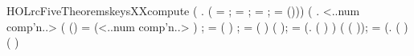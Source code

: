 \begin{SaveVerbatim}{HOLrcFiveTheoremskeysXXcompute}
\HOLTokenTurnstile{} (\HOLSymConst{\HOLTokenForall{}} .
          \HOLSymConst{=}
      (
          =  ;
          =  ;
          =   ;
          =   
         (\HOLSymConst{,}\HOLSymConst{,}\HOLSymConst{,}\HOLSymConst{,}\HOLSymConst{,}))) \HOLSymConst{\HOLTokenConj{}}
   (\HOLSymConst{\HOLTokenForall{}}  .
       <..num comp'n..>   \HOLSymConst{=}
      (
         (\HOLSymConst{,}\HOLSymConst{,}\HOLSymConst{,}\HOLSymConst{,}\HOLSymConst{,}) =  (<..num comp'n..> \HOLSymConst{\ensuremath{-}} )  ;
          = (   \HOLSymConst{\ensuremath{+}}  \HOLSymConst{\ensuremath{+}} ) \HOLSymConst{\HOLTokenRol{}} ;
          = (   \HOLSymConst{\ensuremath{+}}  \HOLSymConst{\ensuremath{+}} ) \HOLSymConst{\HOLTokenRol{}}  ( \HOLSymConst{\ensuremath{+}} );
          =
             (\HOLTokenLambda{}.
                    \HOLSymConst{=}   (   \HOLSymConst{\ensuremath{+}}  \HOLSymConst{\ensuremath{+}} ) \HOLSymConst{\HOLTokenRol{}} 
                     ) ( \HOLSymConst{\HOLTokenProd{}} ( \HOLSymConst{\ensuremath{+}} ));
          =
             (\HOLTokenLambda{}.
                    \HOLSymConst{=}  
                    (   \HOLSymConst{\ensuremath{+}}  \HOLSymConst{\ensuremath{+}} ) \HOLSymConst{\HOLTokenRol{}}  ( \HOLSymConst{\ensuremath{+}} )

\end{SaveVerbatim}
